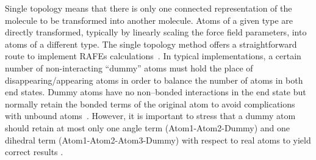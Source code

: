 \documentclass[journal=jctcce,manuscript=article]{achemso}
\begin{document}
 
Single topology means that there is only one connected representation of the molecule to be transformed into another molecule.
Atoms of a given type are directly transformed, typically by linearly scaling the force field parameters, into atoms of a different type. 
The single topology method \cite{doi:10.1021/j100056a020, Michel2010,doi:10.1063/1.449208,doi:10.1021/j100056a020, doi:10.1021/jp981628n}
offers a straightforward route to implement RAFEs calculations~\cite{doi:10.1021/j100056a020, Michel2010}.
In typical implementations, 
a certain number of non-interacting ``dummy'' atoms must hold the place of disappearing/appearing atoms in order to balance the number of atoms in both end states.  
Dummy atoms have no non--bonded interactions in the end state but normally retain the bonded 
terms of the original atom to avoid complications with unbound 
atoms~\cite{doi:10.1021/jp981628n}.  
However, it is important to stress that a dummy atom should retain at most only
one angle term (Atom1-Atom2-Dummy) and one dihedral term (Atom1-Atom2-Atom3-Dummy) with respect to real atoms 
to yield correct results \cite{doi:10.1021/jp981628n,doi:10.1021/jp994193s}.
%
%
\end{document}
